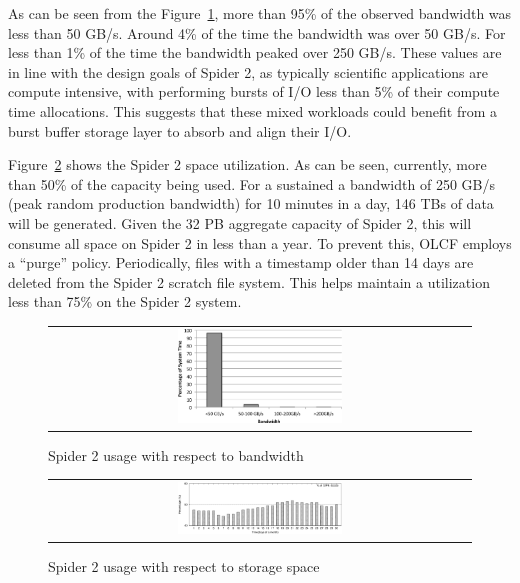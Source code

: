 As can be seen from the Figure~\ref{fig:bwUsage}, more than 95\% of the 
observed bandwidth was less than 50 GB/s. Around 4\% of the time the bandwidth
was over 50 GB/s. For less than 1\% of the time the bandwidth peaked over
250 GB/s. These values are in line with the design goals of Spider 2, as
typically scientific applications are compute intensive, with performing bursts
of I/O less than 5\% of their compute time allocations. This suggests that these 
mixed workloads could benefit from a burst buffer storage layer to absorb and align 
their I/O.

Figure~\ref{fig:storageUsage} shows the Spider 2 space utilization. As can be
seen, currently, more than 50\% of the capacity being used.  For a sustained a
bandwidth of 250 GB/s (peak random production bandwidth) for 10 minutes in a
day, 146 TBs of data will be generated. Given the 32 PB aggregate capacity of
Spider 2, this will consume all space on Spider 2 in less than a year. To
prevent this, OLCF employs a ``purge'' policy. Periodically, files with a
timestamp older than 14 days are deleted from the Spider 2 scratch file system.
This helps maintain a utilization less than 75\% on the Spider 2 system.  

\begin{figure}[!thb]
\begin{center}
\begin{tabular}{c}
{\includegraphics[width=0.40\textwidth]{./figs/bwUsage.eps}}\\
\end{tabular}
\vspace{-0.1in}
\caption{Spider 2 usage with respect to bandwidth}
\label{fig:bwUsage}
\end{center}
\end{figure}



\begin{figure}[!thb]
\begin{center}
\begin{tabular}{c}
{\includegraphics[width=0.40\textwidth]{./figs/storageUsage.eps}}\\
\end{tabular}
\vspace{-0.1in}
\caption{Spider 2 usage with respect to storage space}
\label{fig:storageUsage}
\end{center}
\end{figure}



